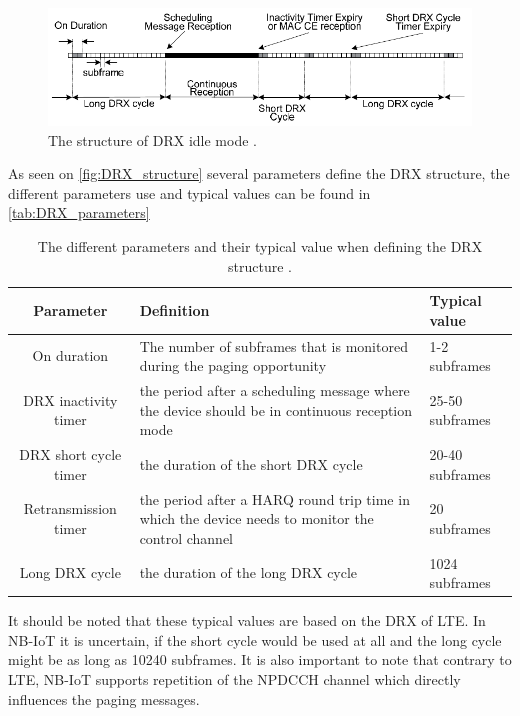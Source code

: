 \begin{figure}[H]
\centering
\includegraphics[width=\textwidth]{figures/DRX_structure.pdf}
\caption{The structure of \gls{DRX} idle mode \citep{book_LTE_for_UMTS2}.}
\label{fig:DRX_structure}
\end{figure}

As seen on \autoref{fig:DRX_structure} several parameters define the DRX structure, the different parameters use and typical values can be found in \autoref{tab:DRX_parameters}

\begin{table}[H]
\centering
\begin{tabular}{|c|p{6cm}|p{4cm}|} \hline
\textbf{Parameter} & \textbf{Definition} & \textbf{Typical value} \\ \hline 
On duration &  The number of subframes that is monitored during the paging opportunity & 1-2 subframes\\ \hline
DRX inactivity timer & the period after a scheduling message where the device should be in continuous reception mode & 25-50 subframes \\ \hline
DRX short cycle timer & the duration of the short DRX cycle & 20-40 subframes \\ \hline
Retransmission timer & the period after a \gls{HARQ} round trip time in which the device needs to monitor the control channel & 20  subframes \\ \hline
Long DRX cycle & the duration of the long DRX cycle & 1024 subframes \\ \hline
\end{tabular}
\caption{The different parameters and their typical value when defining the DRX structure \citep{book_LTE_for_UMTS}.}
\label{tab:DRX_parameters}
\end{table}

It should be noted that these typical values are based on the DRX of LTE. In NB-IoT it is uncertain, if the short cycle would be used at all and the long cycle might be as long as 10240 subframes. It is also important to note that contrary to LTE, NB-IoT supports repetition of the NPDCCH channel which directly influences the paging messages. \citep{NB-IoT_Book}


